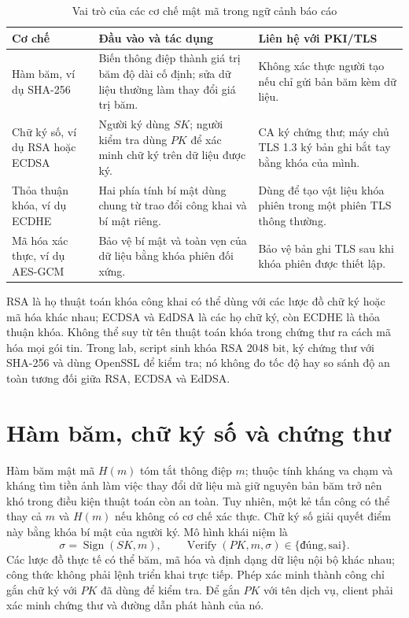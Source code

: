 \begin{table}[ht]
\centering\small
\caption{Vai trò của các cơ chế mật mã trong ngữ cảnh báo cáo}\label{tab:crypto-roles}
\begin{tabular}{p{2.3cm}p{4.4cm}p{5.4cm}}
\toprule
Cơ chế & Đầu vào và tác dụng & Liên hệ với PKI/TLS \\
\midrule
Hàm băm, ví dụ SHA-256 & Biến thông điệp thành giá trị băm độ dài cố định; sửa dữ liệu thường làm thay đổi giá trị băm. & Không xác thực người tạo nếu chỉ gửi bản băm kèm dữ liệu. \\
Chữ ký số, ví dụ RSA hoặc ECDSA & Người ký dùng $SK$; người kiểm tra dùng $PK$ để xác minh chữ ký trên dữ liệu được ký. & CA ký chứng thư; máy chủ TLS 1.3 ký bản ghi bắt tay bằng khóa của mình. \\
Thỏa thuận khóa, ví dụ ECDHE & Hai phía tính bí mật dùng chung từ trao đổi công khai và bí mật riêng. & Dùng để tạo vật liệu khóa phiên trong một phiên TLS thông thường. \\
Mã hóa xác thực, ví dụ AES-GCM & Bảo vệ bí mật và toàn vẹn của dữ liệu bằng khóa phiên đối xứng. & Bảo vệ bản ghi TLS sau khi khóa phiên được thiết lập. \\
\bottomrule
\end{tabular}
\end{table}

RSA là họ thuật toán khóa công khai có thể dùng với các lược đồ chữ ký hoặc mã hóa khác nhau; ECDSA và EdDSA là các họ chữ ký, còn ECDHE là thỏa thuận khóa. Không thể suy từ tên thuật toán khóa trong chứng thư ra cách mã hóa mọi gói tin. Trong lab, script sinh khóa RSA 2048 bit, ký chứng thư với SHA-256 và dùng OpenSSL để kiểm tra; nó không đo tốc độ hay so sánh độ an toàn tương đối giữa RSA, ECDSA và EdDSA.

\section{Hàm băm, chữ ký số và chứng thư}
Hàm băm mật mã $H(m)$ tóm tắt thông điệp $m$; thuộc tính kháng va chạm và kháng tìm tiền ảnh làm việc thay đổi dữ liệu mà giữ nguyên bản băm trở nên khó trong điều kiện thuật toán còn an toàn. Tuy nhiên, một kẻ tấn công có thể thay cả $m$ và $H(m)$ nếu không có cơ chế xác thực. Chữ ký số giải quyết điểm này bằng khóa bí mật của người ký. Mô hình khái niệm là
\[
\sigma=\operatorname{Sign}(SK,m),\qquad
\operatorname{Verify}(PK,m,\sigma)\in\{\text{đúng},\text{sai}\}.
\]
Các lược đồ thực tế có thể băm, mã hóa và định dạng dữ liệu nội bộ khác nhau; công thức không phải lệnh triển khai trực tiếp. Phép xác minh thành công chỉ gắn chữ ký với $PK$ đã dùng để kiểm tra. Để gắn $PK$ với tên dịch vụ, client phải xác minh chứng thư và đường dẫn phát hành của nó.

